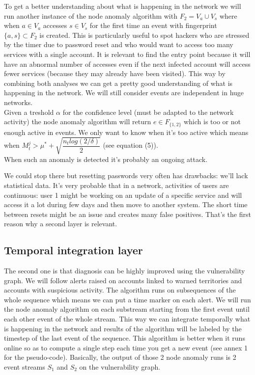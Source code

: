 \documentclass[11pt]{article}
\begin{document}
\indent To get a better understanding about what is happening in the network we will run another instance of the node anomaly algorithm with $F_2 = V_a \cup V_s$ where when $a\in V_a$ accesses $s\in V_s$ for the first time an event with fingerprint $\{a,s\} \subset F_2$ is created. This is particularly useful to spot hackers who are stressed by the timer due to password reset and who would want to access too many services with a single account. It is relevant to find the entry point because it will have an abnormal number of accesses even if the next infected account will access fewer services (because they may already have been visited). This way by combining both analyses we can get a pretty good understanding of what is happening in the network. We will still consider events are independent in huge networks.\\
\indent Given a treshold $\alpha$ for the confidence level (must be adapted to the network activity) the node anomaly algorithm will return $e\in F_{\{1,2\}}$ which is too or not enough active in events. We only want to know when it's too active which means when $M_t^{j} > \mu^*+\sqrt{\dfrac{n_tlog(2/\delta)}{2}}$ (see \cite{node} equation (5)). \\
\indent When such an anomaly is detected it's probably an ongoing attack. 

We could stop there but resetting passwords very often has drawbacks: we'll lack statistical data. It's very probable that in a network, activities of users are continuous: user 1 might be working on an update of a specific service and will access it a lot during few days and then move to another system. The short time between resets might be an issue and creates many false positives. That's the first reason why a second layer is relevant.

\subsection{Temporal integration layer}

The second one is that diagnosis can be highly improved using the vulnerability graph. We will follow alerts raised on accounts linked to warned territories and accounts with suspicious activity. The algorithm runs on subsequences of the whole sequence which means we can put a time marker on each alert. We will run the node anomaly algorithm on each substream starting from the first event until each other event of the whole stream. This way we can integrate temporally what is happening in the network and results of the algorithm will be labeled by the timestep of the last event of the sequence. This algorithm is better when it runs online so as to compute a single step each time you get a new event (see annex 1 for the pseudo-code). Basically, the output of those 2 node anomaly runs is 2 event streams $S_1$ and $S_2$ on the vulnerability graph.
\end{document}
